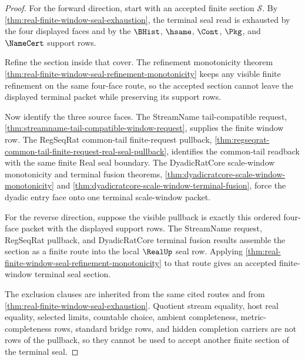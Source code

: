 \begin{proof}
For the forward direction, start with an accepted finite section
$\mathcal S$. By \autoref{thm:real-finite-window-seal-exhaustion}, the
terminal seal read is exhausted by the four displayed faces and by the
$\BHist$, $\hsame$, $\Cont$, $\Pkg$, and $\NameCert$ support rows.

Refine the section inside that cover. The refinement monotonicity theorem
\autoref{thm:real-finite-window-seal-refinement-monotonicity} keeps any
visible finite refinement on the same four-face route, so the accepted section
cannot leave the displayed terminal packet while preserving its support rows.

Now identify the three source faces. The StreamName tail-compatible request,
\autoref{thm:streamname-tail-compatible-window-request}, supplies the finite
window row. The RegSeqRat common-tail finite-request pullback,
\autoref{thm:regseqrat-common-tail-finite-request-real-seal-pullback},
identifies the common-tail readback with the same finite Real seal boundary.
The DyadicRatCore scale-window monotonicity and terminal fusion theorems,
\autoref{thm:dyadicratcore-scale-window-monotonicity} and
\autoref{thm:dyadicratcore-scale-window-terminal-fusion}, force the dyadic
entry face onto one terminal scale-window packet.

For the reverse direction, suppose the visible pullback is exactly this
ordered four-face packet with the displayed support rows. The StreamName
request, RegSeqRat pullback, and DyadicRatCore terminal fusion results assemble
the section as a finite route into the local $\RealUp$ seal row. Applying
\autoref{thm:real-finite-window-seal-refinement-monotonicity} to that route
gives an accepted finite-window terminal seal section.

The exclusion clauses are inherited from the same cited routes and from
\autoref{thm:real-finite-window-seal-exhaustion}. Quotient stream equality,
host real equality, selected limits, countable choice, ambient completeness,
metric-completeness rows, standard bridge rows, and hidden completion carriers
are not rows of the pullback, so they cannot be used to accept another finite
section of the terminal seal.
\end{proof}

